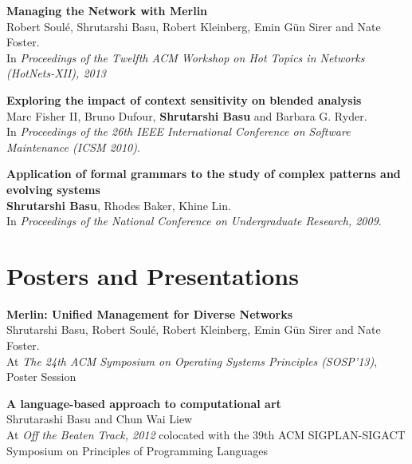 \documentclass[margin,line]{resume}
\begin{document}
\begin{resume}
    {\bf Managing the Network with Merlin} \\
    Robert Soul\'{e}, Shrutarshi Basu, Robert Kleinberg, Emin G\"{u}n Sirer and
    Nate Foster. \\
    In \emph{Proceedings of the Twelfth ACM Workshop on Hot Topics in Networks
      (HotNets-XII), 2013}

    {\bf Exploring the impact of context sensitivity on blended analysis} \\
    Marc Fisher II, Bruno Dufour, {\bf Shrutarshi Basu} and Barbara G. Ryder.\\
    In \emph{Proceedings of the 26th IEEE International Conference on Software
      Maintenance (ICSM 2010)}.

    {\bf Application of formal grammars to the study of complex patterns
      and evolving systems}\\
    {\bf Shrutarshi Basu}, Rhodes Baker, Khine Lin. \\
    In \emph{Proceedings of the National Conference on Undergraduate Research,
      2009}.

    \section{Posters and Presentations}
    {\bf Merlin: Unified Management for Diverse Networks}\\
    Shrutarshi Basu, Robert Soul\'{e}, Robert Kleinberg, Emin G\"{u}n Sirer and
    Nate Foster. \\
    At \emph{The 24th ACM Symposium on Operating Systems Principles (SOSP'13)},
    Poster Session

    {\bf A language-based approach to computational art}\\
    Shrutarashi Basu and Chun Wai Liew\\
    At \emph{Off the Beaten Track, 2012} colocated with the 39th ACM
    SIGPLAN-SIGACT Symposium on Principles of Programming Languages



\end{resume}
\end{document}
